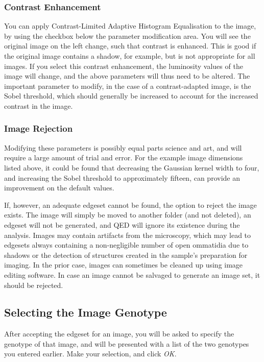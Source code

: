 \documentclass[a4paper,11pt]{article}
\begin{document}
\subsubsection*{Contrast Enhancement}

You can apply Contrast-Limited Adaptive Histogram Equalisation to the image, by using the checkbox below the parameter modification area. You will see the original image on the left change, such that contrast is enhanced. This is good if the original image contains a shadow, for example, but is not appropriate for all images. If you select this contrast enhancement, the luminosity values of the image will change, and the above parameters will thus need to be altered. The important parameter to modify, in the case of a contrast-adapted image, is the Sobel threshold, which should generally be increased to account for the increased contrast in the image.

\subsubsection*{Image Rejection}

Modifying these parameters is possibly equal parts science and art, and will require a large amount of trial and error. For the example image dimensions listed above, it could be found that decreasing the Gaussian kernel width to four, and increasing the Sobel threshold to approximately fifteen, can provide an improvement on the default values. 

If, however, an adequate edgeset cannot be found, the option to reject the image exists. The image will simply be moved to another folder (and not deleted), an edgeset will not be generated, and QED will ignore its existence during the analysis. Images may contain artifacts from the microscopy, which may lead to edgesets always containing a non-negligible number of open ommatidia due to shadows or the detection of structures created in the sample's preparation for imaging. In the prior case, images can sometimes be cleaned up using image editing software. In case an image cannot be salvaged to generate an image set, it should be rejected.





\subsection{Selecting the Image Genotype}
After accepting the edgeset for an image, you will be asked to specify the genotype of that image, and will be presented with a list of the two genotypes you entered earlier. Make your selection, and click \textit{OK}.
\end{document}
